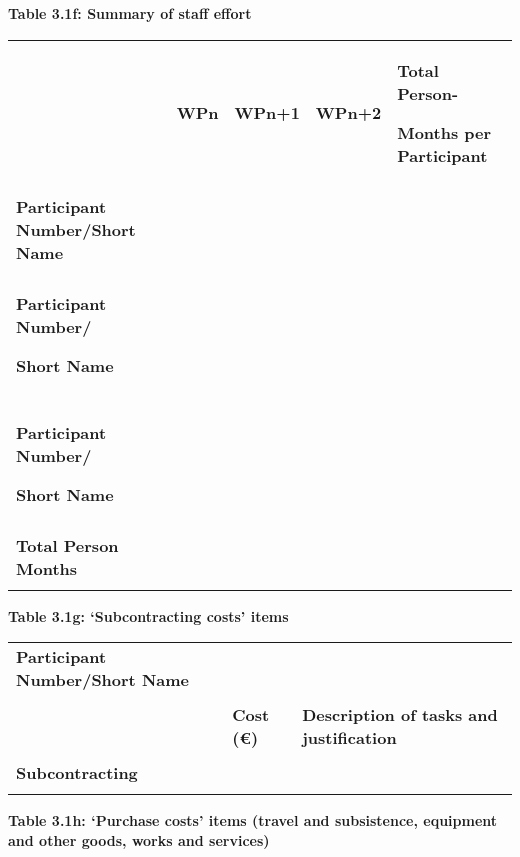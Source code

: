 \textbf{Table 3.1f: Summary of staff effort}

\begin{longtable}[]{@{}
  >{\raggedright\arraybackslash}p{}
  >{\raggedright\arraybackslash}p{}
  >{\raggedright\arraybackslash}p{}
  >{\raggedright\arraybackslash}p{}
  >{\raggedright\arraybackslash}p{}@{}}
\toprule
\endhead
& \textbf{WPn} & \textbf{WPn+1} & \textbf{WPn+2} & \textbf{Total
Person-}

\textbf{Months per Participant} \\
& & & & \\
\textbf{Participant Number/Short Name} & & & & \\
& & & & \\
\textbf{Participant Number/}

\textbf{Short Name} & & & & \\
& & & & \\
\textbf{Participant Number/}

\textbf{Short Name} & & & & \\
& & & & \\
\textbf{Total Person Months} & & & & \\
& & & & \\
\bottomrule
\end{longtable}

\textbf{Table 3.1g: `Subcontracting costs' items }

\begin{longtable}[]{@{}lll@{}}
\toprule
\endhead
\textbf{Participant Number/Short Name} & & \\
& & \\
& \textbf{Cost (€)} & \textbf{Description of tasks and justification} \\
& & \\
\textbf{Subcontracting } & & \\
& & \\
\bottomrule
\end{longtable}

\textbf{Table 3.1h: `Purchase costs' items (travel and subsistence,
equipment and other goods, works and services) }

